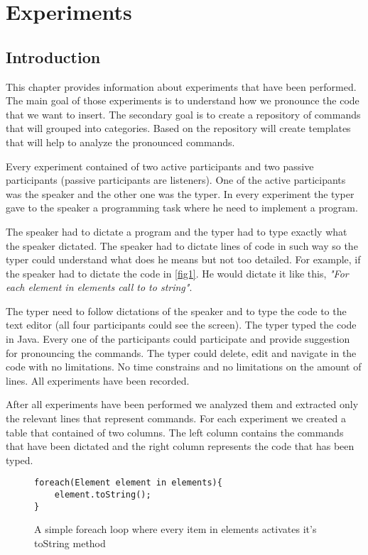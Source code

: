 \chapter{Experiments}
\section{Introduction}
This chapter provides information about experiments that have been performed. The main goal of those experiments is to understand how we pronounce the code that we want to insert. The secondary goal is to create a repository of commands that will grouped into categories. Based on the repository will create templates that will help to analyze the pronounced commands.

Every experiment contained of two active participants and two passive participants (passive participants are listeners). One of the active participants was the speaker and the other one was the typer. In every experiment the typer gave to the speaker a programming task where he need to implement a program. 

The speaker had to dictate a program and the typer had to type exactly what the speaker dictated. The speaker had to dictate lines of code in such way so the typer could understand what does he means but not too detailed. For example, if the speaker had to dictate the code in \autoref{fig1}. He would dictate it like this, \textit{"For each element in elements call to to string"}. 

The typer need to follow dictations of the speaker and to type the code to the text editor (all four participants could see the screen). The typer typed the code in Java. Every one of the participants could participate and provide suggestion for pronouncing the commands. The typer could delete, edit and navigate in the code with no limitations. No time constrains and no limitations on the amount of lines. All experiments have been recorded.

After all experiments have been performed we analyzed them and extracted only the relevant lines that represent commands. For each experiment we created a table that contained of two columns. The left column contains the commands that have been dictated and the right column represents the code that has been typed.

\begin{figure}[H]
\begin{lstlisting}
foreach(Element element in elements){
	element.toString();
} 
\end{lstlisting}
\caption{A simple foreach loop where every item in elements activates it's toString method}
\label{fig1}
\end{figure}
